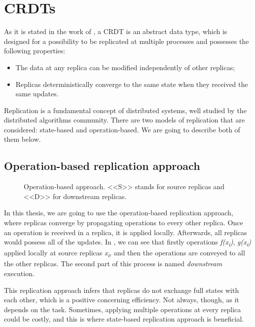\section{CRDTs}
\label{2-crdts}

As it is stated in the work of \citet{3}, a CRDT is an abstract data type, which is designed for a possibility to be replicated at multiple processes and possesses the following properties:


    \begin{itemize}
        \item {The data at any replica can be modified independently of other replicas;}
        \item {Replicas deterministically converge to the same state when they received the same updates.}
    \end{itemize}

Replication is a fundamental concept of distributed systems, well studied by the distributed algorithms community\cite{2}. There are two models of replication that are considered: state-based and operation-based. We are going to describe both of them below. 

\subsection*{Operation-based replication approach}

\begin{figure}[!htb]
    \begin{center}
    \def\svgwidth{\linewidth}
    
    \caption {Operation-based approach\cite{2}. <<S>> stands for source replicas and <<D>> for downstream replicas. }
    \label{fig:theory1}
\end{center}
\end{figure}

In this thesis, we are going to use the operation-based replication approach, where replicas converge by propagating operations to every other replica\cite{3}. Once an operation is received in a replica, it is applied locally. Afterwards, all replicas would possess all of the updates. In , we can see that firstly operations \textit{f(x\textsubscript{i})}, \textit{g(x\textsubscript{i})} applied locally at source replicas \textit{x\textsubscript{i}}, and then the operations are conveyed to all the other replicas. The second part of this process is named \textit{downstream} execution.

This replication approach infers that replicas do not exchange full states with each other, which is a positive concerning efficiency. Not always, though, as it depends on the task. Sometimes, applying multiple operations at every replica could be costly, and this is where state-based replication approach is beneficial.


